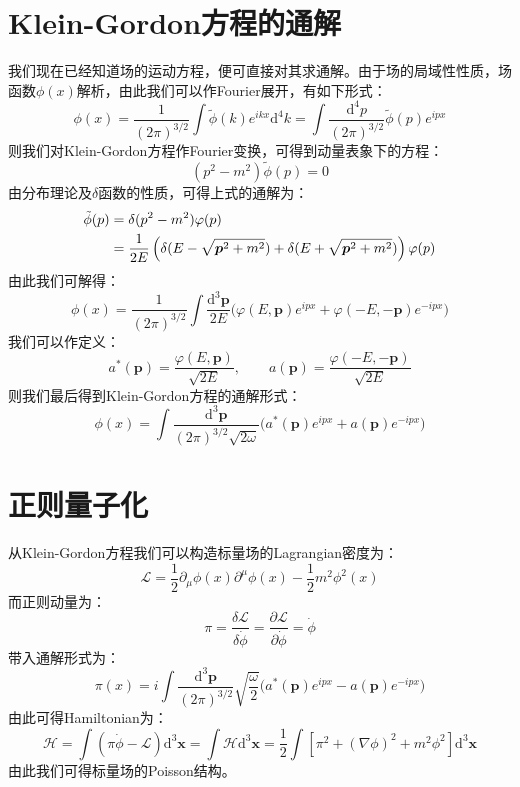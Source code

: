 \section{Klein-Gordon方程的通解}
我们现在已经知道场的运动方程，便可直接对其求通解。由于场的局域性性质，场函数$\phi(x)$解析，由此我们可以作Fourier展开，有如下形式：
\begin{equation}
\phi(x)=\frac{1}{(2\pi)^{3/2}}\int\tilde{\phi}(k)e^{ikx}\mathrm{d}^4k=\int \frac{\mathrm{d}^4 p}{(2\pi)^{3/2}}\tilde{\phi}(p)e^{ipx}
\end{equation}
则我们对Klein-Gordon方程作Fourier变换，可得到动量表象下的方程：
\begin{equation}
(p^2-m^2)\tilde{\phi}(p)=0
\end{equation}
由分布理论及$\delta$函数的性质，可得上式的通解为：
\begin{align}
\tilde{\phi}(p)&=\delta(p^2-m^2)\varphi(p)\notag\\
&=\frac{1}{2E}\left(\delta(E-\sqrt{\boldsymbol{p}^2+m^2})+\delta(E+\sqrt{\boldsymbol{p}^2+m^2})\right)\varphi(p)
\end{align}
由此我们可解得：
\begin{equation}
\phi(x)=\frac{1}{(2\pi)^{3/2}} \int\frac{\mathrm{d}^3\boldsymbol{p}}{2E}\Big(\varphi(E,\boldsymbol{p})e^{ipx}+\varphi(-E,-\boldsymbol{p})e^{-ipx}\Big)
\end{equation}
我们可以作定义：
\begin{equation}
a^*(\boldsymbol{p})=\frac{\varphi(E,\boldsymbol{p})}{\sqrt{2E}},\qquad a(\boldsymbol{p})=\frac{\varphi(-E,-\boldsymbol{p})}{\sqrt{2E}}
\end{equation}
则我们最后得到Klein-Gordon方程的通解形式：
\begin{equation}
\phi(x)=\int\frac{\mathrm{d}^3\boldsymbol{p}}{(2\pi)^{3/2}\sqrt{2\omega}}\Big(a^*(\boldsymbol{p})e^{ipx}+a(\boldsymbol{p})e^{-ipx}\Big)
\end{equation}
\section{正则量子化}
从Klein-Gordon方程我们可以构造标量场的Lagrangian密度为：
\begin{equation}
\mathscr{L}=\frac{1}{2}\partial_\mu\phi(x)\partial^\mu\phi(x)-\frac{1}{2}m^2\phi^2(x)
\end{equation}
而正则动量为：
\begin{equation}
\pi=\frac{\delta\mathcal{L}}{\delta\dot{\phi}}=\frac{\partial\mathscr{L}}{\partial\dot{\phi}}=\dot{\phi}
\end{equation}
带入通解形式为：
\begin{equation}
\pi(x)=i\int\frac{\mathrm{d}^3\boldsymbol{p}}{(2\pi)^{3/2}}\sqrt{\frac{\omega}{2}}\Big(a^*(\boldsymbol{p})e^{ipx}-a(\boldsymbol{p})e^{-ipx}\Big)
\end{equation}
由此可得Hamiltonian为：
\begin{equation}
\mathcal{H}=\int(\pi\dot{\phi}-\mathscr{L})\mathrm{d}^3\boldsymbol{x}=\int\mathscr{H}\mathrm{d}^3\boldsymbol{x}=\frac{1}{2}\int\left[\pi^2+(\nabla\phi)^2+m^2\phi^2\right]\mathrm{d}^3\boldsymbol{x}
\end{equation}
由此我们可得标量场的Poisson结构。

